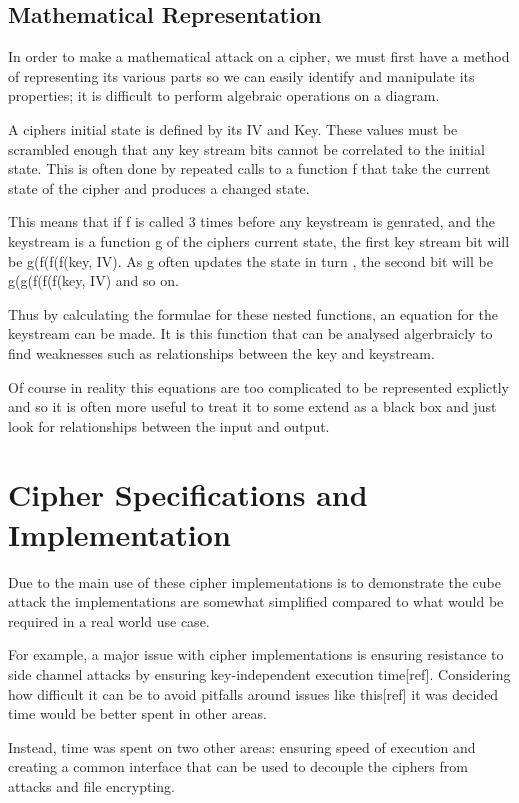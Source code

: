 \documentclass{report}
\begin{document}

\section{Mathematical Representation}
In order to make a mathematical attack on a cipher, we must first have a method
of representing its various parts so we can easily identify and manipulate its properties; it is difficult to perform algebraic operations on a diagram.

A ciphers initial state is defined by its IV and Key. These values must be scrambled enough that any key stream bits cannot be correlated to the initial state. This is often done by repeated calls to a function f that take the current state of the cipher and produces a changed state.

This means that if f is called 3 times before any keystream is genrated, and the keystream is a function g of the ciphers current state, the first key stream bit will be g(f(f(f(key, IV). As g often updates the state in turn , the second bit will be g(g(f(f(f(key, IV) and so on.

Thus by calculating the formulae for these nested functions, an equation for the keystream can be made. It is this function that can be analysed algerbraicly to find weaknesses such as relationships between the key and keystream.


Of course in reality this equations are too complicated to be represented explictly and so it is often more useful to treat it to some extend as a black box and just look for relationships between the input and output.
\chapter{Cipher Specifications  and Implementation}
Due to the main use of these cipher implementations is to demonstrate the cube attack the implementations are somewhat simplified compared to what would be required in a real world use case.

For example, a major issue with cipher implementations is ensuring resistance to side channel attacks by ensuring key-independent execution time[ref]. Considering how difficult it can be to avoid pitfalls around issues like this[ref] it was decided time would be better spent in other areas.

Instead, time was spent on two other areas: ensuring speed of execution and creating a common interface that can be used to decouple the ciphers from attacks and file encrypting.
\end{document}
